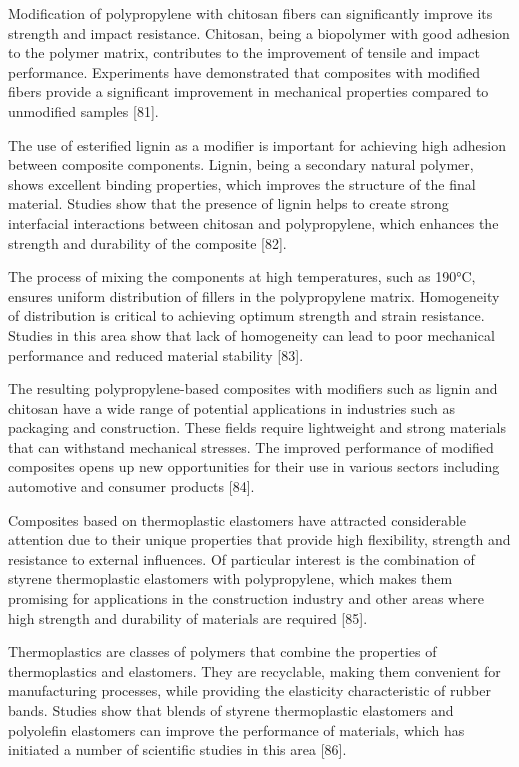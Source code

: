 \begin{multicols}{2}
Modification of polypropylene with chitosan fibers can significantly
improve its strength and impact resistance. Chitosan, being a biopolymer
with good adhesion to the polymer matrix, contributes to the improvement
of tensile and impact performance. Experiments have demonstrated that
composites with modified fibers provide a significant improvement in
mechanical properties compared to unmodified samples {[}81{]}.

The use of esterified lignin as a modifier is important for achieving
high adhesion between composite components. Lignin, being a secondary
natural polymer, shows excellent binding properties, which improves the
structure of the final material. Studies show that the presence of
lignin helps to create strong interfacial interactions between chitosan
and polypropylene, which enhances the strength and durability of the
composite {[}82{]}.

The process of mixing the components at high temperatures, such as
190°C, ensures uniform distribution of fillers in the polypropylene
matrix. Homogeneity of distribution is critical to achieving optimum
strength and strain resistance. Studies in this area show that lack of
homogeneity can lead to poor mechanical performance and reduced material
stability {[}83{]}.

The resulting polypropylene-based composites with modifiers such as
lignin and chitosan have a wide range of potential applications in
industries such as packaging and construction. These fields require
lightweight and strong materials that can withstand mechanical stresses.
The improved performance of modified composites opens up new
opportunities for their use in various sectors including automotive and
consumer products {[}84{]}.

Composites based on thermoplastic elastomers have attracted considerable
attention due to their unique properties that provide high flexibility,
strength and resistance to external influences. Of particular interest
is the combination of styrene thermoplastic elastomers with
polypropylene, which makes them promising for applications in the
construction industry and other areas where high strength and durability
of materials are required {[}85{]}.

Thermoplastics are classes of polymers that combine the properties of
thermoplastics and elastomers. They are recyclable, making them
convenient for manufacturing processes, while providing the elasticity
characteristic of rubber bands. Studies show that blends of styrene
thermoplastic elastomers and polyolefin elastomers can improve the
performance of materials, which has initiated a number of scientific
studies in this area {[}86{]}.


\end{multicols}
